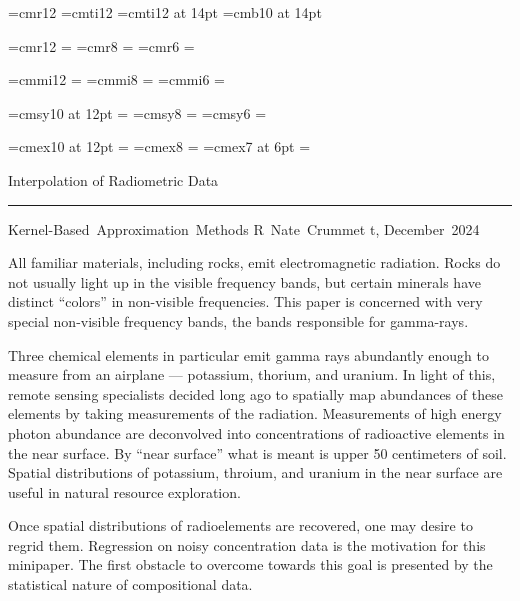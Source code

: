 \font\reportfont=cmr12
\font\reportifont=cmti12%
\font\sectionfont=cmti12 at 14pt
\font\titlefont=cmb10 at 14pt

\font\mathrmfont=cmr12
=\mathrmfont
\font\mathrmfont=cmr8
=\mathrmfont
\font\mathrmfont=cmr6
=\mathrmfont

\font\mathifont=cmmi12
=\mathifont
\font\mathifont=cmmi8
=\mathifont
\font\mathifont=cmmi6
=\mathifont

\font\mathscfont=cmsy10 at 12pt
=\mathscfont
\font\mathscfont=cmsy8
=\mathscfont
\font\mathscfont=cmsy6
=\mathscfont

\font\mathexfont=cmex10 at 12pt
=\mathexfont
\font\mathexfont=cmex8
=\mathexfont
\font\mathexfont=cmex7 at 6pt
=\mathexfont

\def\euclideanr{{\rm I \kern -2pt R}}
\def\sectiontitle#1{\noindent {\sectionfont #1} \par \smallskip}

\reportfont
\baselineskip 14pt
\centerline{\titlefont Interpolation of Radiometric Data}
\vskip 1mm
\hrule height 0.7pt
\vskip 1mm
\noindent
Kernel-Based~Approximation~Methods \hfill R~Nate~Crummet\kern -1pt t, December~2024

\vskip 5mm
\sectiontitle{Background}
All familiar materials, including rocks, emit electromagnetic radiation.
Rocks do not usually light up in the visible frequency bands, but certain minerals have distinct ``colors'' in non-visible frequencies.
This paper is concerned with very special non-visible frequency bands, the bands responsible for {\reportifont gamma-rays\/}.

\medskip
Three chemical elements in particular emit gamma rays abundantly enough to measure from an airplane --- potassium, thorium, and uranium.
In {\reportifont light\/} of this, remote sensing specialists decided long ago to spatially map abundances of these elements by taking measurements of the radiation.
Measurements of high energy photon abundance are deconvolved into concentrations of radioactive elements in the near surface.
By ``near surface'' what is meant is upper 50 centimeters of soil.
Spatial distributions of potassium, throium, and uranium in the near surface are useful in natural resource exploration.

\medskip
Once spatial distributions of radioelements are recovered, one may desire to regrid them.
Regression on noisy concentration data is the motivation for this minipaper.
The first obstacle to overcome towards this goal is presented by the statistical nature of compositional data.

